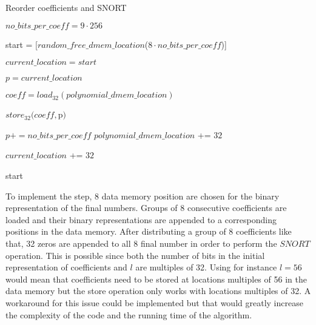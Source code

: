 \begin{algorithm}[h]
  \caption{Reorder coefficients and SNORT}
  \label{alg:step1}
  \begin{algorithmic}[1]


      \State $no\_bits\_per\_coeff = 9 \cdot 256$

      \State start = [$random\_free\_dmem\_location$($8 \cdot no\_bits\_per\_coeff$)]

      \State $current\_location = start$

        \State $p = current\_location$

          \State $coeff = load_{32}(polynomial\_dmem\_location)$ 

          \State $store_{32}(coeff, $p$)$ 

          \State $p += no\_bits\_per\_coeff$
          \State $polynomial\_dmem\_location$ += $32$
        
        \EndFor

        \State $current\_location$ += $32$ 
      \EndFor

      \Return start

      \State 

  \EndProcedure

  \end{algorithmic}
\end{algorithm}


To implement the step, 8 data memory position are chosen for the binary representation of the final numbers. Groups of $8$ consecutive coefficients are loaded and their binary representations are appended to a corresponding positions in the data memory. After distributing a group of $8$ coefficients like that, 32 zeros are appended to all 8 final number in order to perform the $SNORT$ operation. This is possible since both the number of bits in the initial representation of coefficients and $l$ are multiples of 32. Using for instance $l=56$ would mean that coefficients need to be stored at locations multiples of 56 in the data memory but the store operation only works with locations multiples of 32. A workaround for this issue could be implemented but that would greatly increase the complexity of the code and the running time of the algorithm. 


